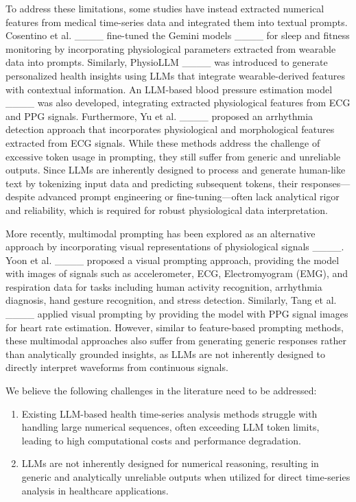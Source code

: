 To address these limitations, some studies have instead extracted numerical features from medical time-series data and integrated them into textual prompts. Cosentino et al. ____ fine-tuned the Gemini models ____ for sleep and fitness monitoring by incorporating physiological parameters extracted from wearable data into prompts. Similarly, PhysioLLM ____ was introduced to generate personalized health insights using LLMs that integrate wearable-derived features with contextual information. An LLM-based blood pressure estimation model ____ was also developed, integrating extracted physiological features from ECG and PPG signals. Furthermore, Yu et al. ____ proposed an arrhythmia detection approach that incorporates physiological and morphological features extracted from ECG signals. While these methods address the challenge of excessive token usage in prompting, they still suffer from generic and unreliable outputs. Since LLMs are inherently designed to process and generate human-like text by tokenizing input data and predicting subsequent tokens, their responses—despite advanced prompt engineering or fine-tuning—often lack analytical rigor and reliability, which is required for robust physiological data interpretation.

More recently, multimodal prompting has been explored as an alternative approach by incorporating visual representations of physiological signals ____. Yoon et al. ____ proposed a visual prompting approach, providing the model with images of signals such as accelerometer, ECG, Electromyogram (EMG), and respiration data for tasks including human activity recognition, arrhythmia diagnosis, hand gesture recognition, and stress detection. Similarly, Tang et al. ____ applied visual prompting by providing the model with PPG signal images for heart rate estimation. However, similar to feature-based prompting methods, these multimodal approaches also suffer from generating generic responses rather than analytically grounded insights, as LLMs are not inherently designed to directly interpret waveforms from continuous signals.

We believe the following challenges in the literature need to be addressed:
\begin{enumerate}
    \item Existing LLM-based health time-series analysis methods struggle with handling large numerical sequences, often exceeding LLM token limits, leading to high computational costs and performance degradation.
    \item LLMs are not inherently designed for numerical reasoning, resulting in generic and analytically unreliable outputs when utilized for direct time-series analysis in healthcare applications.
\end{enumerate}




